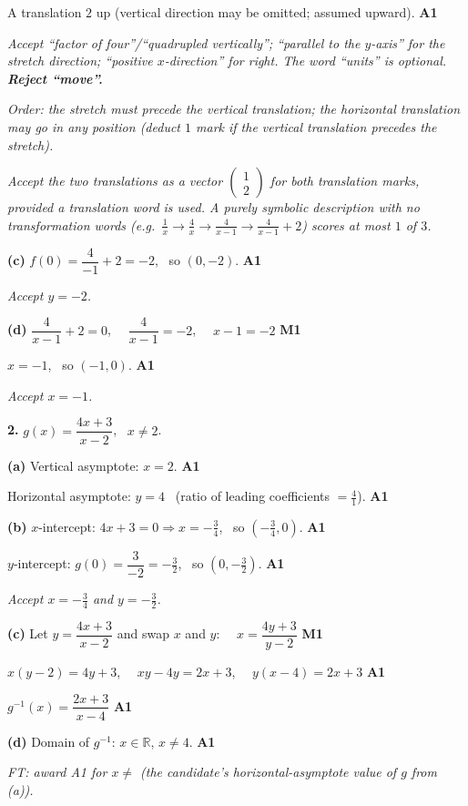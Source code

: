 \documentclass[12pt, twoside]{article}
\begin{document}
A translation $2$ up (vertical direction may be omitted; assumed upward). \hfill \textbf{A1}

\emph{Accept ``factor of four''/``quadrupled vertically''; ``parallel to the $y$-axis''
for the stretch direction; ``positive $x$-direction'' for right. The word
``units'' is optional. \textbf{Reject ``move''.}}

\emph{Order: the stretch must precede the vertical translation; the horizontal
translation may go in any position (deduct $1$ mark if the vertical translation
precedes the stretch).}

\emph{Accept the two translations as a vector
$\left(\begin{smallmatrix}1\\2\end{smallmatrix}\right)$ for both translation marks,
provided a translation word is used. A purely symbolic description with no
transformation words (e.g.\ $\tfrac1x\to\tfrac4x\to\tfrac{4}{x-1}\to\tfrac{4}{x-1}+2$)
scores at most $1$ of $3$.}

\medskip

\textbf{(c)} $f(0)=\dfrac{4}{-1}+2=-2$, \ so $(0,-2)$. \hfill \textbf{A1}

\emph{Accept $y=-2$.}

\medskip

\textbf{(d)} $\dfrac{4}{x-1}+2=0$, \ \ $\dfrac{4}{x-1}=-2$, \ \ $x-1=-2$ \hfill \textbf{M1}

$x=-1$, \ so $(-1,0)$. \hfill \textbf{A1}

\emph{Accept $x=-1$.}

\medskip

\noindent\textbf{2.} $\displaystyle g(x)=\dfrac{4x+3}{x-2}$, \ $x\ne 2$.

\medskip

\textbf{(a)} Vertical asymptote: $x=2$. \hfill \textbf{A1}

Horizontal asymptote: $y=4$ \ (ratio of leading coefficients $=\tfrac{4}{1}$). \hfill \textbf{A1}

\medskip

\textbf{(b)} $x$-intercept: $4x+3=0 \Rightarrow x=-\tfrac{3}{4}$, \ so $\left(-\tfrac{3}{4},0\right)$. \hfill \textbf{A1}

$y$-intercept: $g(0)=\dfrac{3}{-2}=-\tfrac{3}{2}$, \ so $\left(0,-\tfrac{3}{2}\right)$. \hfill \textbf{A1}

\emph{Accept $x=-\tfrac{3}{4}$ and $y=-\tfrac{3}{2}$.}

\medskip

\textbf{(c)} Let $y=\dfrac{4x+3}{x-2}$ and swap $x$ and $y$: \ \ $x=\dfrac{4y+3}{y-2}$ \hfill \textbf{M1}

$x(y-2)=4y+3$, \ \ $xy-4y=2x+3$, \ \ $y(x-4)=2x+3$ \hfill \textbf{A1}

$g^{-1}(x)=\dfrac{2x+3}{x-4}$ \hfill \textbf{A1}

\medskip

\textbf{(d)} Domain of $g^{-1}$: $x\in\mathbb{R}$, $x\ne 4$. \hfill \textbf{A1}

\emph{FT: award A1 for $x\ne$ (the candidate's horizontal-asymptote value of $g$ from (a)).}
\end{document}
